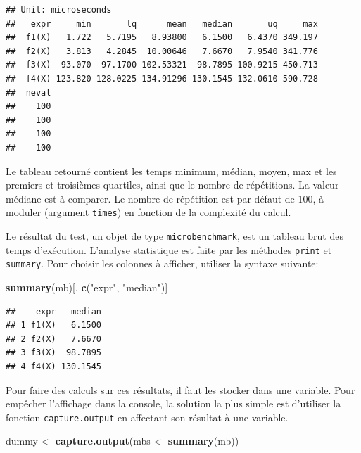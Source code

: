 \documentclass[
  12pt,
  french,
  a4paper,
  extrafontsizes,onecolumn,openright
  ]{memoir}
\newenvironment{Shaded}{\begin{snugshade}}{\end{snugshade}}
\newcommand{\FunctionTok}[1]{\textcolor[rgb]{0.13,0.29,0.53}{\textbf{#1}}}
\newcommand{\NormalTok}[1]{#1}
\newcommand{\OtherTok}[1]{\textcolor[rgb]{0.56,0.35,0.01}{#1}}
\newcommand{\StringTok}[1]{\textcolor[rgb]{0.31,0.60,0.02}{#1}}
\begin{document}
\begin{verbatim}
## Unit: microseconds
##   expr     min       lq      mean   median       uq     max
##  f1(X)   1.722   5.7195   8.93800   6.1500   6.4370 349.197
##  f2(X)   3.813   4.2845  10.00646   7.6670   7.9540 341.776
##  f3(X)  93.070  97.1700 102.53321  98.7895 100.9215 450.713
##  f4(X) 123.820 128.0225 134.91296 130.1545 132.0610 590.728
##  neval
##    100
##    100
##    100
##    100
\end{verbatim}

\normalsize

Le tableau retourné contient les temps minimum, médian, moyen, max et les premiers et troisièmes quartiles, ainsi que le nombre de répétitions.
La valeur médiane est à comparer.
Le nombre de répétition est par défaut de 100, à moduler (argument \texttt{times}) en fonction de la complexité du calcul.

Le résultat du test, un objet de type \texttt{microbenchmark}, est un tableau brut des temps d'exécution.
L'analyse statistique est faite par les méthodes \texttt{print} et \texttt{summary}.
Pour choisir les colonnes à afficher, utiliser la syntaxe suivante:

\scriptsize

\begin{Shaded}
\begin{Highlighting}[]
\FunctionTok{summary}\NormalTok{(mb)[, }\FunctionTok{c}\NormalTok{(}\StringTok{"expr"}\NormalTok{, }\StringTok{"median"}\NormalTok{)]}
\end{Highlighting}
\end{Shaded}

\begin{verbatim}
##    expr   median
## 1 f1(X)   6.1500
## 2 f2(X)   7.6670
## 3 f3(X)  98.7895
## 4 f4(X) 130.1545
\end{verbatim}

\normalsize

Pour faire des calculs sur ces résultats, il faut les stocker dans une variable.
Pour empêcher l'affichage dans la console, la solution la plus simple est d'utiliser la fonction \texttt{capture.output} en affectant son résultat à une variable.

\scriptsize

\begin{Shaded}
\begin{Highlighting}[]
\NormalTok{dummy }\OtherTok{\textless{}{-}} \FunctionTok{capture.output}\NormalTok{(mbs }\OtherTok{\textless{}{-}} \FunctionTok{summary}\NormalTok{(mb))}
\end{Highlighting}
\end{Shaded}
\end{document}
